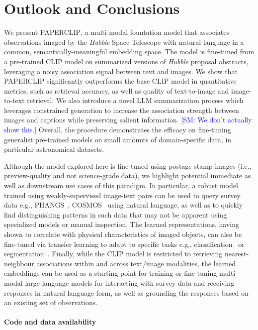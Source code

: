 \documentclass[10pt]{article} %
\newcommand{\SM}[1]{\textcolor{blue}{[SM: #1]}}
\newcommand{\hubble}{\emph{Hubble}\xspace}
\begin{document}
\section{Outlook and Conclusions}
\label{sec:conclusion}

We present \textsc{PAPERCLIP}, a multi-modal fountation model that associates observations imaged by the \hubble Space Telescope with natural language in a common, semantically-meaningful embedding space.
%
The model is fine-tuned from a pre-trained CLIP model on summarized versions of \hubble proposal abstracts, leveraging a noisy association signal between text and images.
%
We show that \textsc{PAPERCLIP} significantly outperforms the base CLIP model in quantitative metrics, such as retrieval accuracy, as well as quality of text-to-image and image-to-text retrieval.
%
We also introduce a novel LLM summarization process which leverages constrained generation to increase the association strength between images and captions while preserving salient information. \SM{We don't actually show this.}
%
Overall, the procedure demonstrates the efficacy on fine-tuning generalist pre-trained models on small amounts of domain-specific data, in particular astronomical datasets.

Although the model explored here is fine-tuned using postage stamp images (i.e., preview-quality and not science-grade data), we highlight potential immediate as well as downstream use cases of this paradigm.
%
In particular, a robust model trained using weakly-supervised image-text pairs can be used to query survey data e.g., PHANGS~\citep{lee2022phangs}, COSMOS~\citep{scoville2007cosmic} using natural language, as well as to quickly find distinguishing patterns in such data that may not be apparent using specialized models or manual inspection.
%
The learned representations, having shown to correlate with physical characteristics of imaged objects, can also be fine-tuned via transfer learning to adapt to specific tasks e.g., classification~\citep{wei2020deep} or segmentation~\citep{hausen2020morpheus}.
%
Finally, while the CLIP model is restricted to retrieving nearest-neighbour associations within and across text/image modalities, the learned embeddings can be used as a starting point for training or fine-tuning multi-modal large-language models for interacting with survey data and receiving responses in natural language form, as well as grounding the responses based on an existing set of observations.

\paragraph*{Code and data availability}
\end{document}
